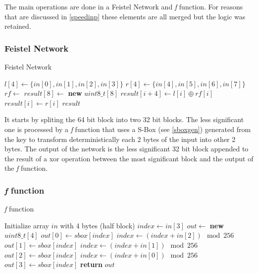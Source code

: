 \documentclass{article} %
\begin{document}
The main operations are done in a Feistel Network and \textit{f} function. For reasons that are discussed in \autoref{speedinp} these elements are all merged
but the logic was retained.

\subsubsection{Feistel Network}

\begin{algorithm}[H]
  \caption{Feistel Network}
  \begin{algorithmic}[1]

  \State $l[4] \gets \{in[0], in[1], in[2], in[3]\}$
  \State $r[4] \gets \{in[4], in[5], in[6], in[7]\}$
  \State $rf \gets$ 
  \State $result[8] \gets$ \textbf{new} $uint8\_t[8]$
    \State $result[i + 4] \gets l[i] \oplus rf[i]$
    \State $result[i] \gets r[i]$
  \EndFor
  \State \Return $result$
  \end{algorithmic}
\end{algorithm}

It starts by spliting the 64 bit block into two 32 bit blocks.
The less significant one is processed by a \textit{f} function that uses a S-Box (see \autoref{sboxgen}) 
generated from the key to transform deterministically each 2 bytes of the input into other 2 bytes.
The output of the network is the less significant 32 bit block appended to the result of a xor operation between 
the most significant block and the output of the \textit{f} function.

\subsubsection{\textit{f} function}

\begin{algorithm}[H]
  \caption{\textit{f} function}
\begin{algorithmic}[1]
  \State Initialize array $in$ with 4 bytes (half block)
  \State $index \gets in[3]$
  \State $out \gets$ \textbf{new} $uint8\_t[4]$
  \State $out[0] \gets sbox[index]$
  \State $index \gets (index + in[2]) \mod 256$
  \State $out[1] \gets sbox[index]$
  \State $index \gets (index + in[1]) \mod 256$
  \State $out[2] \gets sbox[index]$
  \State $index \gets (index + in[0]) \mod 256$
  \State $out[3] \gets sbox[index]$
  \State \textbf{return} $out$
\end{algorithmic}
\end{algorithm}
\end{document}
